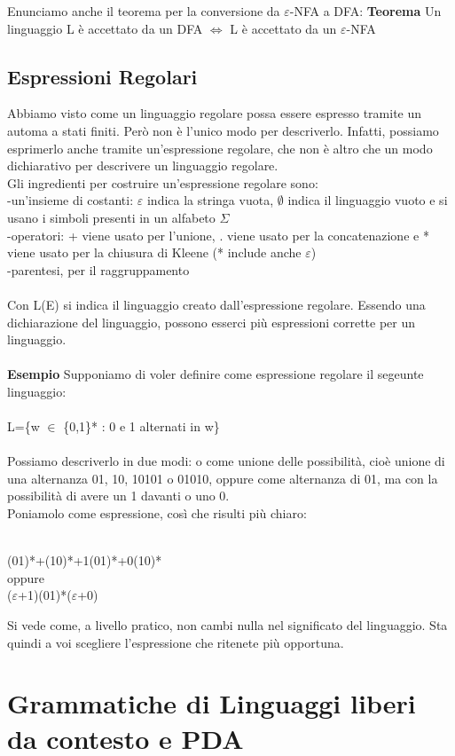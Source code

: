 \documentclass[]{article}
\begin{document}
				Enunciamo anche il teorema per la conversione da $\varepsilon$-NFA a DFA:
				\newline
				\newline
				\textbf{Teorema}\newline
				Un linguaggio L è accettato da un DFA $\Leftrightarrow$ L è accettato da un $\varepsilon$-NFA
		\subsection{Espressioni Regolari}
			Abbiamo visto come un linguaggio regolare possa essere espresso tramite un automa a stati finiti. Però non è l'unico modo per descriverlo. Infatti, possiamo esprimerlo anche tramite un'espressione regolare, che non è altro che un modo dichiarativo per descrivere un linguaggio regolare.\\
			Gli ingredienti per costruire un'espressione regolare sono:\\
			-un'insieme di costanti: $\varepsilon$ indica la stringa vuota, $\emptyset$ indica il linguaggio vuoto e si usano i simboli presenti in un alfabeto $\Sigma$\\
			-operatori: + viene usato per l'unione, . viene usato per la concatenazione e * viene usato per la chiusura di Kleene (* include anche $\varepsilon$)\\
			-parentesi, per il raggruppamento\\\\
			Con L(E) si indica il linguaggio creato dall'espressione regolare. Essendo una dichiarazione del linguaggio, possono esserci più espressioni corrette per un linguaggio.\\\\
			\textbf{Esempio} Supponiamo di voler definire come espressione regolare il segeunte linguaggio:\\\\
			L=\{w $\in$ \{0,1\}* : 0 e 1 alternati in w\}\\\\
			Possiamo descriverlo in due modi: o come unione delle possibilità, cioè unione di una alternanza 01, 10, 10101 o 01010, oppure come alternanza di 01, ma con la possibilità di avere un 1 davanti o uno 0.\\
			Poniamolo come espressione, così che risulti più chiaro:\\\\
			\begin{center}
				(01)*+(10)*+1(01)*+0(10)*\\oppure\\ ($\varepsilon$+1)(01)*($\varepsilon$+0)
			\end{center}
			Si vede come, a livello pratico, non cambi nulla nel significato del linguaggio. Sta quindi a voi scegliere l'espressione che ritenete più opportuna.
	\section{Grammatiche di Linguaggi liberi da contesto e PDA}
\end{document}
